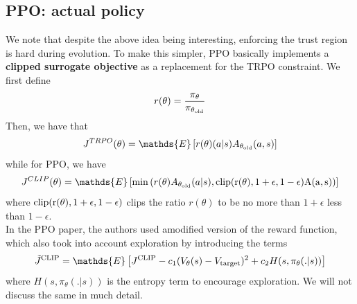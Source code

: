 \subsection{PPO: actual policy}
We note that despite the above idea being interesting, enforcing the trust region is hard during evolution. To make this simpler, PPO basically implements a \textbf{clipped surrogate objective} as a replacement for the TRPO constraint. We first define
\begin{align}
    r(\theta) = \frac{\pi_{\theta}}{\pi_{\theta_{\rm{old}}}}
\end{align}
Then, we have that 
\begin{align}
    J^{TRPO}(\theta) = \mathds{E}\left[r(\theta)(a|s)A_{\theta_{\rm{old}}}(a,s) \right]
\end{align}
while for PPO, we have 
\begin{align}
    J^{CLIP}(\theta)= \mathds{E}\left[\min\left( r(\theta)A_{\theta_{\rm{old}}}(a|s),\rm{clip}(r(\theta),1+\epsilon,1-\epsilon)A(a,s) \right)\right]
\end{align}
where $\rm{clip}(r(\theta),1+\epsilon,1-\epsilon)$ clips the ratio $r(\theta)$ to be no more than $1+\epsilon$ less than $1-\epsilon$.\\
In the PPO paper, the authors used amodified version of the reward function, which also took into account exploration by introducing the terms
\begin{align}
    \tilde{J}^{\rm{CLIP}} = \mathds{E}\left[J^{\rm{CLIP}} - c_1(V_{\theta}(s)-V_{\rm{target}})^2+c_2 H(s,\pi_{\theta}(.|s)) \right]
\end{align} 
where $H(s,\pi_{\theta}(.|s))$ is the entropy term to encourage exploration. We will not discuss the same in much detail. 
